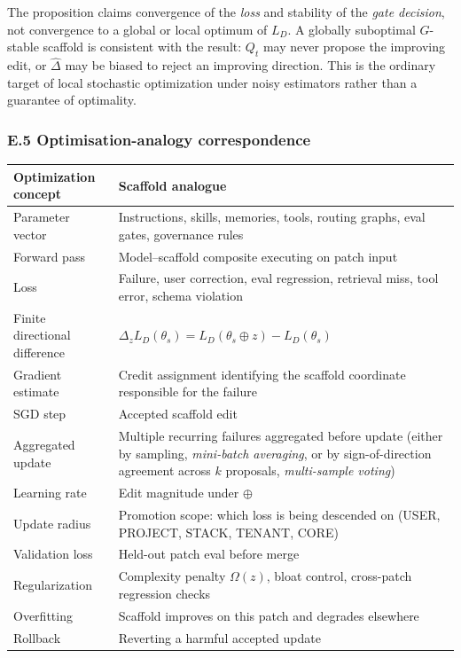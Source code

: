 The proposition claims convergence of the \emph{loss} and stability of
the \emph{gate decision}, not convergence to a global or local optimum
of \(L_D\). A globally suboptimal \(G\)-stable scaffold is consistent
with the result: \(Q_t\) may never propose the improving edit, or
\(\widehat{\Delta}\) may be biased to reject an improving direction.
This is the ordinary target of local stochastic optimization under noisy
estimators rather than a guarantee of optimality.

\subsubsection{E.5 Optimisation-analogy
correspondence}\label{e.5-optimisation-analogy-correspondence}

{\def\LTcaptype{none} %
\begin{longtable}[]{@{}
  >{\raggedright\arraybackslash}p{}
  >{\raggedright\arraybackslash}p{}@{}}
\toprule\noalign{}
\begin{minipage}[b]{\linewidth}\raggedright
Optimization concept
\end{minipage} & \begin{minipage}[b]{\linewidth}\raggedright
Scaffold analogue
\end{minipage} \\
\midrule\noalign{}
\endhead
\bottomrule\noalign{}
\endlastfoot
Parameter vector & Instructions, skills, memories, tools, routing
graphs, eval gates, governance rules \\
Forward pass & Model--scaffold composite executing on patch input \\
Loss & Failure, user correction, eval regression, retrieval miss, tool
error, schema violation \\
Finite directional difference &
\(\Delta_z L_D(\theta_s) = L_D(\theta_s \oplus z) - L_D(\theta_s)\) \\
Gradient estimate & Credit assignment identifying the scaffold
coordinate responsible for the failure \\
SGD step & Accepted scaffold edit \\
Aggregated update & Multiple recurring failures aggregated before update
(either by sampling, \emph{mini-batch averaging}, or by
sign-of-direction agreement across \(k\) proposals, \emph{multi-sample
voting}) \\
Learning rate & Edit magnitude under \(\oplus\) \\
Update radius & Promotion scope: which loss is being descended on (USER,
PROJECT, STACK, TENANT, CORE) \\
Validation loss & Held-out patch eval before merge \\
Regularization & Complexity penalty \(\Omega(z)\), bloat control,
cross-patch regression checks \\
Overfitting & Scaffold improves on this patch and degrades elsewhere \\
Rollback & Reverting a harmful accepted update \\
\end{longtable}
}

